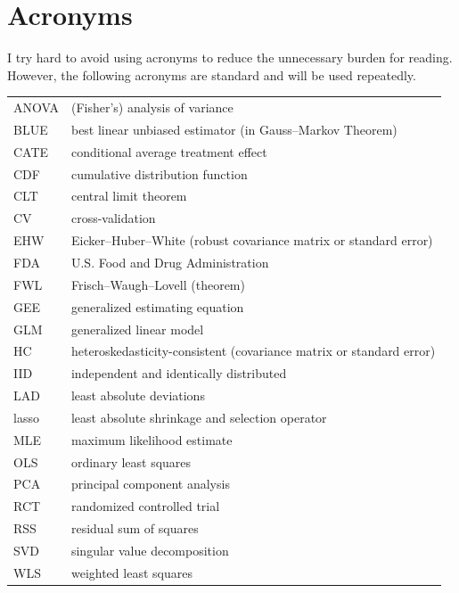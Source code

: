 \chapter*{Acronyms}


I try hard to avoid using acronyms to reduce the unnecessary burden for reading. However, the following acronyms are standard and will be used repeatedly. 

\begin{tabular}{ll}
ANOVA & (Fisher's) analysis of variance \\ 
BLUE & best linear unbiased estimator (in Gauss--Markov Theorem) \\ 
CATE & conditional average treatment effect \\
CDF& cumulative distribution function\\ 
CLT & central limit theorem\\
CV& cross-validation\\ 
EHW& Eicker--Huber--White (robust covariance matrix or standard error)\\
FDA &  U.S. Food and Drug Administration \\  
FWL & Frisch--Waugh--Lovell (theorem)\\ 
GEE & generalized estimating equation\\ 
GLM& generalized linear model\\
HC& heteroskedasticity-consistent (covariance matrix or standard error)\\ 
IID &  independent and identically distributed\\
LAD & least absolute deviations\\ 
lasso & least absolute shrinkage and selection operator \\
MLE& maximum likelihood estimate\\ 
OLS& ordinary least squares\\
PCA& principal component analysis\\ 
RCT& randomized controlled trial\\ 
RSS& residual sum of squares\\ 
SVD& singular value decomposition\\ 
WLS& weighted least squares
\end{tabular}

